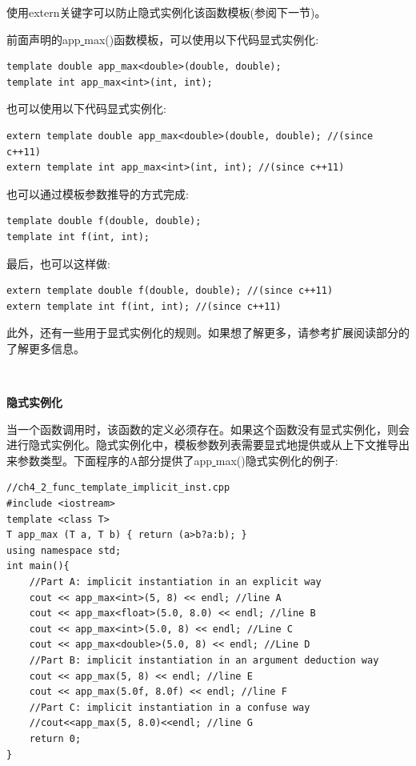 使用extern关键字可以防止隐式实例化该函数模板(参阅下一节)。 \par
前面声明的app\underline{ }max()函数模板，可以使用以下代码显式实例化: \par

\begin{lstlisting}[caption={}]
template double app_max<double>(double, double);
template int app_max<int>(int, int);
\end{lstlisting}

也可以使用以下代码显式实例化: \par

\begin{lstlisting}[caption={}]
extern template double app_max<double>(double, double); //(since c++11)
extern template int app_max<int>(int, int); //(since c++11)
\end{lstlisting}

也可以通过模板参数推导的方式完成: \par

\begin{lstlisting}[caption={}]
template double f(double, double);
template int f(int, int);
\end{lstlisting}

最后，也可以这样做: \par

\begin{lstlisting}[caption={}]
extern template double f(double, double); //(since c++11)
extern template int f(int, int); //(since c++11)
\end{lstlisting}

此外，还有一些用于显式实例化的规则。如果想了解更多，请参考扩展阅读部分的了解更多信息。 \par

\noindent\textbf{}\ \par
\textbf{隐式实例化} \ \par
当一个函数调用时，该函数的定义必须存在。如果这个函数没有显式实例化，则会进行隐式实例化。隐式实例化中，模板参数列表需要显式地提供或从上下文推导出来参数类型。下面程序的A部分提供了app\underline{ }max()隐式实例化的例子: \par

\begin{lstlisting}[caption={}]
//ch4_2_func_template_implicit_inst.cpp
#include <iostream>
template <class T>
T app_max (T a, T b) { return (a>b?a:b); }
using namespace std;
int main(){
	//Part A: implicit instantiation in an explicit way
	cout << app_max<int>(5, 8) << endl; //line A
	cout << app_max<float>(5.0, 8.0) << endl; //line B
	cout << app_max<int>(5.0, 8) << endl; //Line C
	cout << app_max<double>(5.0, 8) << endl; //Line D
	//Part B: implicit instantiation in an argument deduction way
	cout << app_max(5, 8) << endl; //line E
	cout << app_max(5.0f, 8.0f) << endl; //line F
	//Part C: implicit instantiation in a confuse way
	//cout<<app_max(5, 8.0)<<endl; //line G
	return 0;
}
\end{lstlisting}

